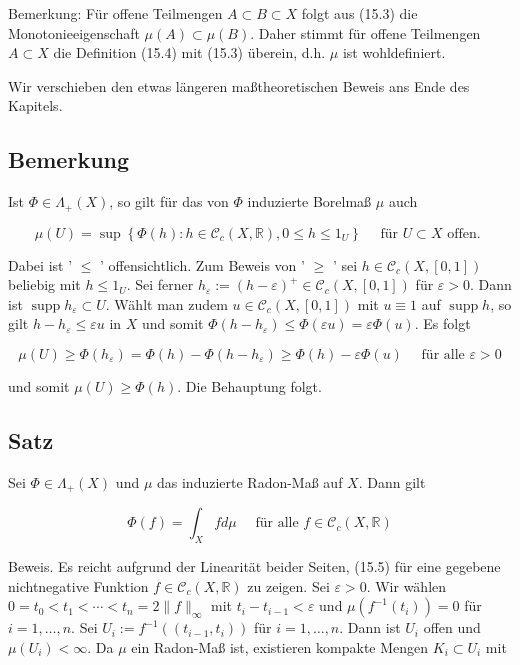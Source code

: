 \documentclass[10pt, letterpaper]{article}
\begin{document}
Bemerkung: Für offene Teilmengen $A \subset B \subset X$ folgt aus (15.3) die Monotonieeigenschaft $\mu(A) \subset \mu(B)$. Daher stimmt für offene Teilmengen $A \subset X$ die Definition (15.4) mit (15.3) überein, d.h. $\mu$ ist wohldefiniert.

Wir verschieben den etwas längeren maßtheoretischen Beweis ans Ende des Kapitels.

\subsection*{Bemerkung}
Ist $\Phi \in \Lambda_{+}(X)$, so gilt für das von $\Phi$ induzierte Borelmaß $\mu$ auch

$$
\mu(U)=\sup \left\{\Phi(h): h \in \mathcal{C}_{c}(X, \mathbb{R}), 0 \leq h \leq 1_{U}\right\} \quad \text { für } U \subset X \text { offen. }
$$

Dabei ist ' $\leq$ ' offensichtlich. Zum Beweis von ' $\geq$ ' sei $h \in \mathcal{C}_{c}(X,[0,1])$ beliebig mit $h \leq 1_{U}$. Sei ferner $h_{\varepsilon}:=(h-\varepsilon)^{+} \in \mathcal{C}_{c}(X,[0,1])$ für $\varepsilon>0$. Dann ist $\operatorname{supp} h_{\varepsilon} \subset U$. Wählt man zudem $u \in \mathcal{C}_{c}(X,[0,1])$ mit $u \equiv 1$ auf $\operatorname{supp} h$, so gilt $h-h_{\varepsilon} \leq \varepsilon u$ in $X$ und somit $\Phi\left(h-h_{\varepsilon}\right) \leq \Phi(\varepsilon u)=\varepsilon \Phi(u)$. Es folgt

$$
\mu(U) \geq \Phi\left(h_{\varepsilon}\right)=\Phi(h)-\Phi\left(h-h_{\varepsilon}\right) \geq \Phi(h)-\varepsilon \Phi(u) \quad \text { für alle } \varepsilon>0
$$

und somit $\mu(U) \geq \Phi(h)$. Die Behauptung folgt.

\subsection*{Satz}
Sei $\Phi \in \Lambda_{+}(X)$ und $\mu$ das induzierte Radon-Maß auf $X$. Dann gilt

$$
\Phi(f)=\int_{X} f d \mu \quad \text { für alle } f \in \mathcal{C}_{c}(X, \mathbb{R})
$$

Beweis. Es reicht aufgrund der Linearität beider Seiten, (15.5) für eine gegebene nichtnegative Funktion $f \in \mathcal{C}_{c}(X, \mathbb{R})$ zu zeigen. Sei $\varepsilon>0$. Wir wählen $0=t_{0}< t_{1}<\cdots<t_{n}=2\|f\|_{\infty}$ mit $t_{i}-t_{i-1}<\varepsilon$ und $\mu\left(f^{-1}\left(t_{i}\right)\right)=0$ für $i=1, \ldots, n$. Sei $U_{i}:=f^{-1}\left(\left(t_{i-1}, t_{i}\right)\right)$ für $i=1, \ldots, n$. Dann ist $U_{i}$ offen und $\mu\left(U_{i}\right)<\infty$. Da $\mu$ ein Radon-Maß ist, existieren kompakte Mengen $K_{i} \subset U_{i}$ mit
\end{document}
